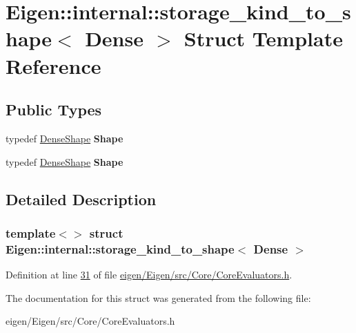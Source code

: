 \hypertarget{struct_eigen_1_1internal_1_1storage__kind__to__shape_3_01_dense_01_4}{}\section{Eigen\+:\+:internal\+:\+:storage\+\_\+kind\+\_\+to\+\_\+shape$<$ Dense $>$ Struct Template Reference}
\label{struct_eigen_1_1internal_1_1storage__kind__to__shape_3_01_dense_01_4}
\subsection*{Public Types}
\begin{DoxyCompactItemize}
\item 
\mbox{\label{struct_eigen_1_1internal_1_1storage__kind__to__shape_3_01_dense_01_4_ac00df7ae7c2e3a8665a9df27a306b423}} 
typedef \hyperlink{struct_eigen_1_1_dense_shape}{Dense\+Shape} {\bfseries Shape}
\item 
\mbox{\label{struct_eigen_1_1internal_1_1storage__kind__to__shape_3_01_dense_01_4_ac00df7ae7c2e3a8665a9df27a306b423}} 
typedef \hyperlink{struct_eigen_1_1_dense_shape}{Dense\+Shape} {\bfseries Shape}
\end{DoxyCompactItemize}


\subsection{Detailed Description}
\subsubsection*{template$<$$>$\newline
struct Eigen\+::internal\+::storage\+\_\+kind\+\_\+to\+\_\+shape$<$ Dense $>$}



Definition at line \hyperlink{eigen_2_eigen_2src_2_core_2_core_evaluators_8h_source_l00031}{31} of file \hyperlink{eigen_2_eigen_2src_2_core_2_core_evaluators_8h_source}{eigen/\+Eigen/src/\+Core/\+Core\+Evaluators.\+h}.



The documentation for this struct was generated from the following file\+:\begin{DoxyCompactItemize}
\item 
eigen/\+Eigen/src/\+Core/\+Core\+Evaluators.\+h\end{DoxyCompactItemize}
